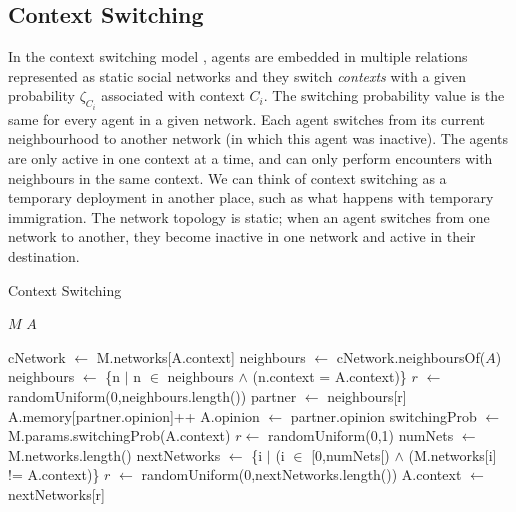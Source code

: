 \documentclass[preprint,number]{elsarticle}
\begin{document}
	
	\subsection{Context Switching}
	\label{sec:models_cs}
	In the context switching model \cite{Antunes2009}, agents are embedded in multiple relations represented as static social networks and they switch \textit{contexts} with a given probability $\zeta_{C_i}$ associated with context $C_i$. The switching probability value is the same for every agent in a given network.  Each agent switches from its current neighbourhood to another network (in which this agent was inactive). The agents are only active in one context at a time, and can only perform encounters with neighbours in the same context. We can think of context switching as a temporary deployment in another place, such as what happens with temporary immigration. The network topology is static; when an agent switches from one network to another, they become inactive in one network and active in their destination. 
	\begin{algorithm}[H]
		\caption{Context Switching}
		\label{model:context_switching}
		\begin{algorithmic}
			\vspace{0.5em}
			\STATE $M$ 
			\STATE $A$ 
			\\ \hrulefill 
			
			\STATE{}
			\STATE cNetwork $\leftarrow$ M.networks[A.context]
			\STATE 
			\STATE {}
			\STATE neighbours $\leftarrow$ cNetwork.neighboursOf($A$) 
			\STATE {}
			\STATE neighbours $\leftarrow$ \{n $|$ n $\in$ neighbours $\wedge$ (n.context = A.context)\}
			\STATE
			\STATE{} 
			\STATE $r$ $\leftarrow$ randomUniform(0,neighbours.length())
			\STATE partner $\leftarrow$ neighbours[r]
			\STATE
			\STATE {}
			\STATE {}
			\STATE A.memory[partner.opinion]++
			\STATE A.opinion $\leftarrow$ partner.opinion
			\ENDIF
			\STATE
			\STATE {}
			\STATE switchingProb $\leftarrow$ M.params.switchingProb(A.context)
			\STATE $r \leftarrow $ randomUniform(0,1)
			\STATE numNets $\leftarrow$ M.networks.length()
			\STATE nextNetworks $\leftarrow$ \{i $|$ (i $\in$ [0,numNets[) $\wedge$ (M.networks[i] != A.context)\}
			\STATE $r$ $\leftarrow$ randomUniform(0,nextNetworks.length())
			\STATE A.context $\leftarrow$ nextNetworks[r]
			\ENDIF
		\end{algorithmic}
	\end{algorithm}
\end{document}
